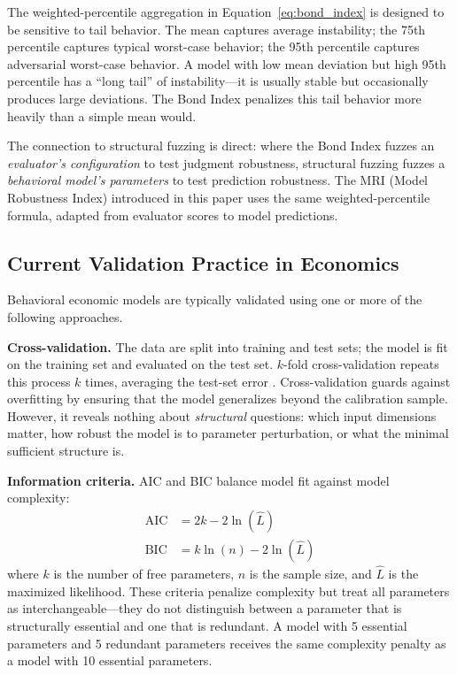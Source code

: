 \documentclass[12pt]{article}
\begin{document}
The weighted-percentile aggregation in Equation~\eqref{eq:bond_index} is designed to be sensitive to tail behavior.  The mean captures average instability; the 75th percentile captures typical worst-case behavior; the 95th percentile captures adversarial worst-case behavior.  A model with low mean deviation but high 95th percentile has a ``long tail'' of instability---it is usually stable but occasionally produces large deviations.  The Bond Index penalizes this tail behavior more heavily than a simple mean would.

The connection to structural fuzzing is direct: where the Bond Index fuzzes an \emph{evaluator's configuration} to test judgment robustness, structural fuzzing fuzzes a \emph{behavioral model's parameters} to test prediction robustness.  The MRI (Model Robustness Index) introduced in this paper uses the same weighted-percentile formula, adapted from evaluator scores to model predictions.

\subsection{Current Validation Practice in Economics}

Behavioral economic models are typically validated using one or more of the following approaches.

\textbf{Cross-validation.}  The data are split into training and test sets; the model is fit on the training set and evaluated on the test set.  $k$-fold cross-validation repeats this process $k$ times, averaging the test-set error \cite{stone1974,geisser1975}.  Cross-validation guards against overfitting by ensuring that the model generalizes beyond the calibration sample.  However, it reveals nothing about \emph{structural} questions: which input dimensions matter, how robust the model is to parameter perturbation, or what the minimal sufficient structure is.

\textbf{Information criteria.}  AIC \cite{burnham2002} and BIC \cite{schwarz1978} balance model fit against model complexity:
\begin{align}
    \mathrm{AIC} &= 2k - 2\ln(\hat{L}) \label{eq:aic} \\
    \mathrm{BIC} &= k \ln(n) - 2\ln(\hat{L}) \label{eq:bic}
\end{align}
where $k$ is the number of free parameters, $n$ is the sample size, and $\hat{L}$ is the maximized likelihood.  These criteria penalize complexity but treat all parameters as interchangeable---they do not distinguish between a parameter that is structurally essential and one that is redundant.  A model with 5 essential parameters and 5 redundant parameters receives the same complexity penalty as a model with 10 essential parameters.
\end{document}
